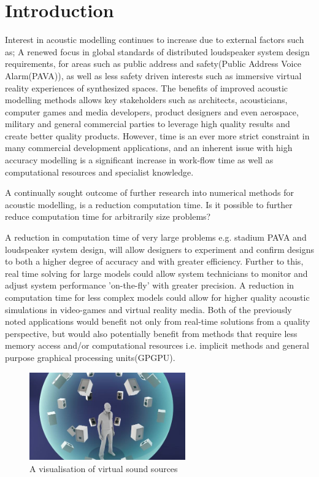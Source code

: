 \documentclass{svproc}
\begin{document}
\section{Introduction}
Interest in acoustic modelling continues to increase due to external factors such as; A renewed focus in global standards of distributed loudspeaker system design requirements, for areas such as public address and safety(Public Address Voice Alarm(PAVA)), as well as less safety driven interests such as immersive virtual reality experiences of synthesized spaces. The benefits of improved acoustic modelling methods allows key stakeholders such as architects, acousticians, computer games and media developers, product designers and even aerospace, military and general commercial parties to leverage high quality results and create better quality products. However, time is an ever more strict constraint in many commercial development applications, and an inherent issue with high accuracy modelling is a significant increase in work-flow time as well as computational resources and specialist knowledge.\par 

A continually sought outcome of further research into numerical methods for acoustic modelling, is a reduction computation time. Is it possible to further reduce computation time for arbitrarily size problems?\par

A reduction in computation time of very large problems e.g. stadium PAVA and loudspeaker system design, will allow designers to experiment and confirm designs to both a higher degree of accuracy and with greater efficiency. Further to this, real time solving for large models could allow system technicians to monitor and adjust system performance 'on-the-fly' with greater precision. A reduction in computation time for less complex models could allow for higher quality acoustic simulations in video-games and virtual reality media. Both of the previously noted applications would benefit not only from real-time solutions from a quality perspective, but would also potentially benefit from  methods that require less memory access and/or computational resources i.e. implicit methods and general purpose graphical processing units(GPGPU). 


\par

\begin{figure}
\centering
\includegraphics[width=0.6\textwidth]{googlevirtualsoundsources.jpg}
\centering
\caption{A visualisation of virtual sound sources ~\cite{googlevr2016}}
\end{figure}
\end{document}
